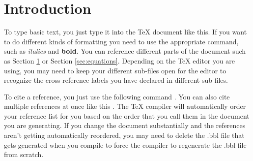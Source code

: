 \section{Introduction}
\label{sec:intro} %
To type basic text, you just type it into the TeX document like this. If you want to do different kinds of formatting you need to use the appropriate command, such as \textit{italics} and \textbf{bold}. You can reference different parts of the document such as Section \ref{sec:intro} or Section \ref{sec:equations}. Depending on the TeX editor you are using, you may need to keep your different sub-files open for the editor to recognize the cross-reference labels you have declared in different sub-files. 

To cite a reference, you just use the following command \cite{jin2011theory}. You can also cite multiple references at once like this \cite{jin2011theory,pozar2011microwave,jin2015finite}. The TeX compiler will automatically order your reference list for you based on the order that you call them in the document you are generating. If you change the document substantially and the references aren't getting automatically reordered, you may need to delete the .bbl file that gets generated when you compile to force the compiler to regenerate the .bbl file from scratch. 